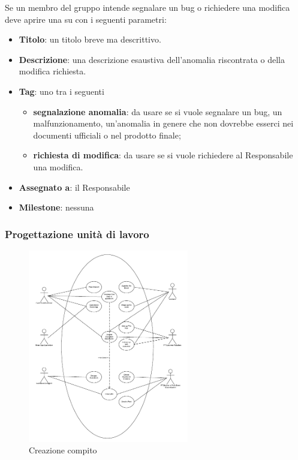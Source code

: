Se un membro del gruppo intende segnalare un bug o richiedere una modifica deve aprire una  su  con i seguenti parametri:
\begin{itemize}
 \item \textbf{Titolo}: un titolo breve ma descrittivo.
 \item \textbf{Descrizione}: una descrizione esaustiva dell'anomalia riscontrata o della modifica richiesta.
 \item \textbf{Tag}: uno tra i seguenti
  \begin{itemize}
   \item \textbf{segnalazione anomalia}: da usare se si vuole segnalare un bug, un malfunzionamento, un'anomalia in genere che non dovrebbe esserci nei documenti ufficiali o nel prodotto finale;
   \item \textbf{richiesta di modifica}: da usare se si vuole richiedere al Responsabile una modifica.
  \end{itemize}
 \item \textbf{Assegnato a}: il Responsabile
 \item \textbf{Milestone}: nessuna
\end{itemize}

\subsubsection{Progettazione unità di lavoro}

\begin{figure}[H]
    \centering
    \includegraphics[width=7cm]{uml-processi/progettazione_unita_di_lavoro.png}
    \caption{Creazione compito}
\end{figure}

